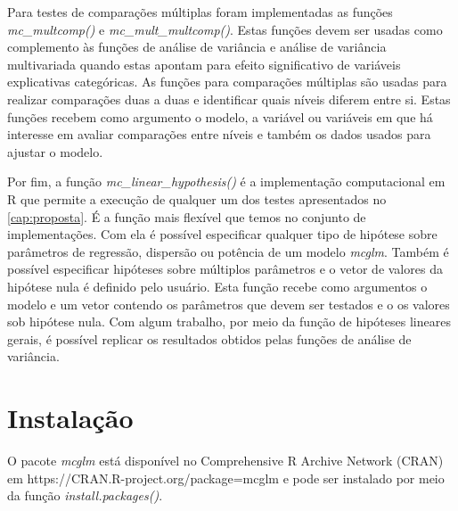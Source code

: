 Para testes de comparações múltiplas foram implementadas as funções \emph{mc\_multcomp()} e \emph{mc\_mult\_multcomp()}. Estas funções devem ser usadas como complemento às funções de análise de variância e análise de variância multivariada quando estas apontam para efeito significativo de variáveis explicativas categóricas. As funções para comparações múltiplas são usadas para realizar comparações duas a duas e identificar quais níveis diferem entre si. Estas funções recebem como argumento o modelo, a variável ou variáveis em que há interesse em avaliar comparações entre níveis e também os dados usados para ajustar o modelo.

Por fim, a função \emph{mc\_linear\_hypothesis()} é a implementação computacional em R que permite a execução de qualquer um dos testes apresentados no \autoref{cap:proposta}. É a função mais flexível que temos no conjunto de implementações. Com ela é possível especificar qualquer tipo de hipótese sobre parâmetros de regressão, dispersão ou potência de um modelo \emph{mcglm}. Também é possível especificar hipóteses sobre múltiplos parâmetros e o vetor de valores da hipótese nula é definido pelo usuário. Esta função recebe como argumentos o modelo e um vetor contendo os parâmetros que devem ser testados e o os valores sob hipótese nula. Com algum trabalho, por meio da função de hipóteses lineares gerais, é possível replicar os resultados obtidos pelas funções de análise de variância.


\section{Instalação}



O pacote \emph{mcglm} está disponível no Comprehensive R Archive Network (CRAN) em https://CRAN.R-project.org/package=mcglm e pode ser instalado por meio da função \emph{install.packages()}.

\begin{knitrout}
\color{fgcolor}\begin{kframe}
\begin{alltt}
\hlstd{(}\hlstd{)}
\end{alltt}
\end{kframe}
\end{knitrout}

